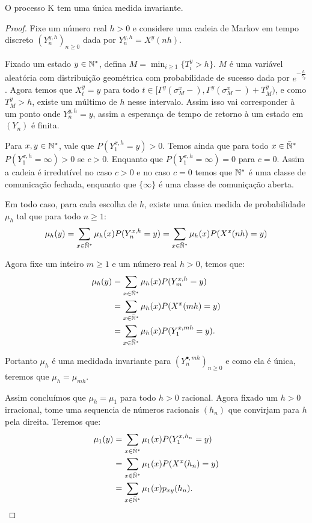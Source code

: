 \begin{proposicao}
  O processo K tem uma única medida invariante.
\end{proposicao}
\begin{proof}
  Fixe um número real $h > 0$ e considere uma cadeia de Markov em
  tempo discreto $(Y^{y, h}_n)_{n \geq 0}$ dada por $Y^{y, h}_n =
  X^y(n h)$.

  Fixado um estado $y \in {\mathbb{N^*}}$, defina $M = \min_{i \geq 1} \{ T_i^y >
  h \}$. $M$ é uma variável aleatória com distribuição geométrica com
  probabilidade de sucesso dada por $e^{-\frac{h}{\gamma_y}}$. Agora
  temos que $X_t^y = y$ para todo $t \in [\Gamma^y(\sigma_M^x-),
  \Gamma^y(\sigma_M^x-) + T_M^y)$, e como $T_M^y > h$, existe um
  múltimo de $h$ nesse intervalo. Assim isso vai corresponder à um
  ponto onde $Y_n^{y, h} = y$, assim a esperança de tempo de retorno à
  um estado em $(Y_n)$ é finita.


  Para $x, y \in {\mathbb{N^*}}$, vale que $P (Y^{x, h}_1 = y) > 0$. Temos ainda
  que para todo $x \in {\mathbb{\bar{N}^*}}$ $P (Y^{x, h}_1 = \infty ) > 0$ se $c >
  0$. Enquanto que $P (Y^{x, h}_1 = \infty) = 0$ para $c = 0$. Assim
  a cadeia é irredutível no caso $c > 0$ e no caso $c = 0$ temos que
  ${\mathbb{N^*}}$ é uma classe de comunicação fechada, enquanto que $\{\infty\}$
  é uma classe de comuniçação aberta.


  Em todo caso, para cada escolha de $h$, existe uma única medida de
  probabilidade $\mu_h$ tal que para todo $n \geq 1$:
  \begin{displaymath}
    \mu_h (y) = \sum_{x \in {\mathbb{\bar{N}^*}}} \mu_h(x) P ( Y_n^ {x, h} = y) =
    \sum_{x \in {\mathbb{\bar{N}^*}}} \mu_h(x) P ( X^x (nh) = y)
  \end{displaymath}

  Agora fixe um inteiro $m \geq 1$ e um número real $h > 0$, temos que:
  \begin{align*}
    \mu_h (y) &= \sum_{x \in {\mathbb{\bar{N}^*}}} \mu_h(x) P ( Y_{m}^ {x, h} = y)\\
    &= \sum_{x \in {\mathbb{\bar{N}^*}}} \mu_h(x) P ( X^x (m h) = y) \\
    &= \sum_{x \in {\mathbb{\bar{N}^*}}} \mu_h(x) P ( Y_{1}^ {x, m h} = y).
  \end{align*}

  Portanto $\mu_h$ é uma medidada invariante para $(Y^{\bullet, mh}_n)_{n
    \geq 0}$ e como ela é única, teremos que $\mu_h = \mu_{m h}$.

  Assim concluímos que $\mu_{h} = \mu_1$ para todo $h > 0$ racional.
  Agora fixado um $h > 0$ irracional, tome uma sequencia de números
  racionais $(h_n)$ que convirjam para $h$ pela direita. Teremos que:
  \begin{align*}
    \mu_1(y) &= \sum_{x \in {\mathbb{\bar{N}^*}}} \mu_1(x) P ( Y_{1}^ {x, h_n} = y)\\
    &= \sum_{x \in {\mathbb{\bar{N}^*}}} \mu_1(x) P ( X^x(h_n) = y)\\
    &= \sum_{x \in {\mathbb{\bar{N}^*}}} \mu_1(x) p_{x y} (h_n).    
  \end{align*}
  

\end{proof}
